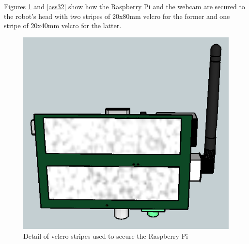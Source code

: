 	
Figures \ref{ass31} and \ref{ass32} show how the Raspberry Pi and the webcam are secured to the robot's head with two stripes of 20x80mm velcro for the former and one stripe of 20x40mm velcro for the latter.\\



	\begin{minipage}{\linewidth}
      \centering
      \begin{minipage}{0.45\linewidth}
          \begin{figure}[H]
            \includegraphics[scale=0.35]{images/Assembly/31.png}
			\caption{Detail of velcro stripes used to secure the Raspberry Pi }
			\label{ass31}
          \end{figure}
      \end{minipage}
      \hspace{0.05\linewidth}
      \begin{minipage}{0.45\linewidth}
          \begin{figure}[H]

\end{figure}
\end{minipage}
\end{minipage}

